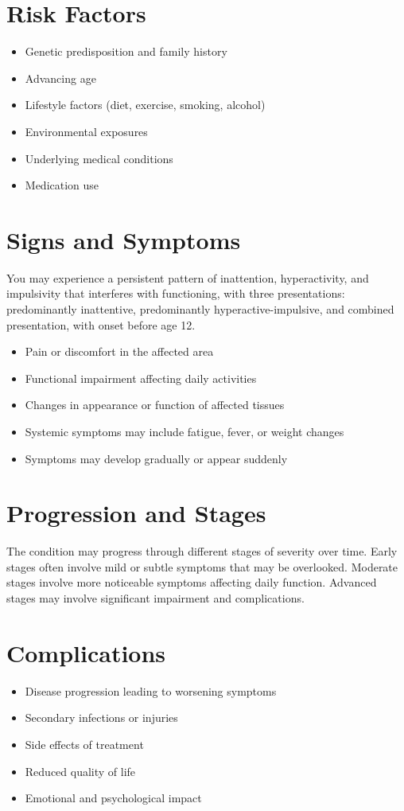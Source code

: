 \section{Risk Factors}
\begin{itemize}[noitemsep]
  \item Genetic predisposition and family history
  \item Advancing age
  \item Lifestyle factors (diet, exercise, smoking, alcohol)
  \item Environmental exposures
  \item Underlying medical conditions
  \item Medication use
\end{itemize}
\section{Signs and Symptoms}
You may experience a persistent pattern of inattention, hyperactivity, and impulsivity that interferes with functioning, with three presentations: predominantly inattentive, predominantly hyperactive-impulsive, and combined presentation, with onset before age 12.

\begin{itemize}[noitemsep]
  \item Pain or discomfort in the affected area
  \item Functional impairment affecting daily activities
  \item Changes in appearance or function of affected tissues
  \item Systemic symptoms may include fatigue, fever, or weight changes
  \item Symptoms may develop gradually or appear suddenly
\end{itemize}
\section{Progression and Stages}
The condition may progress through different stages of severity over time. Early stages often involve mild or subtle symptoms that may be overlooked. Moderate stages involve more noticeable symptoms affecting daily function. Advanced stages may involve significant impairment and complications.
\section{Complications}
\begin{itemize}[noitemsep]
  \item Disease progression leading to worsening symptoms
  \item Secondary infections or injuries
  \item Side effects of treatment
  \item Reduced quality of life
  \item Emotional and psychological impact
\end{itemize}
